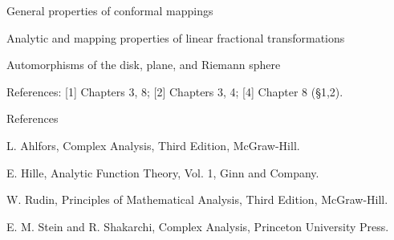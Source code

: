 \documentclass[a4paper,portrait,12pt]{article}
\begin{document}
\begin{flushleft}
General properties of conformal mappings
\end{flushleft}


\begin{flushleft}
Analytic and mapping properties of linear fractional transformations
\end{flushleft}


\begin{flushleft}
Automorphisms of the disk, plane, and Riemann sphere
\end{flushleft}


\begin{flushleft}
References: [1] Chapters 3, 8; [2] Chapters 3, 4; [4] Chapter 8 (§1,2).
\end{flushleft}


\begin{flushleft}
References
\end{flushleft}


\begin{flushleft}
[1] L. Ahlfors, Complex Analysis, Third Edition, McGraw-Hill.
\end{flushleft}


\begin{flushleft}
[2] E. Hille, Analytic Function Theory, Vol. 1, Ginn and Company.
\end{flushleft}


\begin{flushleft}
[3] W. Rudin, Principles of Mathematical Analysis, Third Edition, McGraw-Hill.
\end{flushleft}


\begin{flushleft}
[4] E. M. Stein and R. Shakarchi, Complex Analysis, Princeton University Press.
\end{flushleft}


\begin{flushleft}
\end{flushleft}





\newpage
\end{document}
